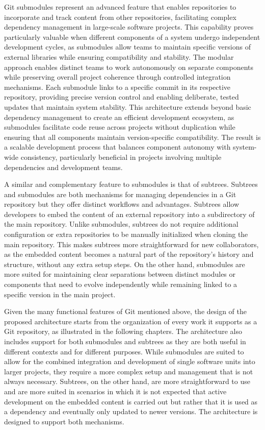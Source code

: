 Git submodules represent an advanced feature that enables repositories to incorporate and track content from other repositories, facilitating complex dependency management in large-scale software projects. This capability proves particularly valuable when different components of a system undergo independent development cycles, as submodules allow teams to maintain specific versions of external libraries while ensuring compatibility and stability. The modular approach enables distinct teams to work autonomously on separate components while preserving overall project coherence through controlled integration mechanisms. Each submodule links to a specific commit in its respective repository, providing precise version control and enabling deliberate, tested updates that maintain system stability. This architecture extends beyond basic dependency management to create an efficient development ecosystem, as submodules facilitate code reuse across projects without duplication while ensuring that all components maintain version-specific compatibility. The result is a scalable development process that balances component autonomy with system-wide consistency, particularly beneficial in projects involving multiple dependencies and development teams.

A similar and complementary feature to submodules is that of subtrees. Subtrees and submodules are both mechanisms for managing dependencies in a Git repository but they offer distinct workflows and advantages. Subtrees allow developers to embed the content of an external repository into a subdirectory of the main repository. Unlike submodules, subtrees do not require additional configuration or extra repositories to be manually initialized when cloning the main repository. This makes subtrees more straightforward for new collaborators, as the embedded content becomes a natural part of the repository's history and structure, without any extra setup steps. On the other hand, submodules are more suited for maintaining clear separations between distinct modules or components that need to evolve independently while remaining linked to a specific version in the main project.

Given the many functional features of Git mentioned above, the design of the proposed architecture starts from the organization of every work it supports as a Git repository, as illustrated in the following chapters. The architecture also includes support for both submodules and subtrees as they are both useful in different contexts and for different purposes. While submodules are suited to allow for the combined integration and development of single software units into larger projects, they require a more complex setup and management that is not always necessary. Subtrees, on the other hand, are more straightforward to use and are more suited in scenarios in which it is not expected that active development on the embedded content is carried out but rather that it is used as a dependency and eventually only updated to newer versions. The architecture is designed to support both mechanisms.
